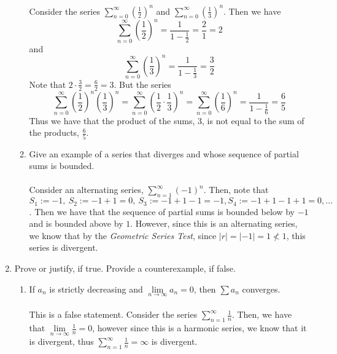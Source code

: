 \documentclass[12pt,letterpaper]{article}
\newcommand{\limx}[2]{\displaystyle\lim\limits_{#1 \to #2}}
\theoremstyle{case}
\theoremstyle{definition}
\begin{document}
\begin{enumerate}
\begin{enumerate}
			\\\\Consider the series $\displaystyle\sum_{n=0}^{\infty} \left(\frac{1}{2}\right)^n$ and $\displaystyle\sum_{n=0}^{\infty} \left(\frac{1}{3}\right)^n$. Then we have
			\[\sum_{n=0}^{\infty} \left(\frac{1}{2}\right)^n=\frac{1}{1-\frac{1}{2}}=\frac{2}{1}=2\]
			and
			\[\sum_{n=0}^{\infty} \left(\frac{1}{3}\right)^n = \frac{1}{1-\frac{1}{3}} = \frac{3}{2}\]
			Note that $2 \cdot \frac{3}{2}=\frac{6}{2} = 3$. But the series
			\[\sum_{n=0}^{\infty} \left(\frac{1}{2}\right)^n\left(\frac{1}{3}\right)^n = \sum_{n=0}^{\infty} \left(\frac{1}{2} \cdot \frac{1}{3}\right)^n = \sum_{n=0}^{\infty} \left(\frac{1}{6}\right)^n = \frac{1}{1-\frac{1}{6}}=\frac{6}{5}\]
			Thus we have that the product of the sums, 3, is not equal to the sum of the products, $\frac{6}{5}$.\\
			\item Give an example of a series that diverges and whose sequence of partial sums is bounded.
			\\\\Consider an alternating series, $\displaystyle\sum_{n=1}^{\infty} (-1)^n$. Then, note that $S_1:=-1,\ S_2:=-1+1=0,\ S_3:=-1+1-1=-1, S_4:=-1+1-1+1=0,\dots$. Then we have that the sequence of partial sums is bounded below by $-1$ and is bounded above by $1$. However, since this is an alternating series, we know that by the \textit{Geometric Series Test}, since $|r| = |-1|=1 \nless 1$, this series is divergent.
		\end{enumerate}
	
		\item Prove or justify, if true. Provide a counterexample, if false.
		\begin{enumerate}
			\item If $a_n$ is strictly decreasing and $\limx{n}{\infty} a_n=0$, then $\sum a_n$ converges.
			\\\\This is a false statement. Consider the series $\displaystyle\sum_{n=1}^{\infty} \frac{1}{n}$. Then, we have that $\limx{n}{\infty} \frac{1}{n} =0$, however since this is a harmonic series, we know that it is divergent, thus $\displaystyle\sum_{n=1}^{\infty} \frac{1}{n} = \infty$ is divergent.\\
			

\end{enumerate}
\end{enumerate}
\end{document}
